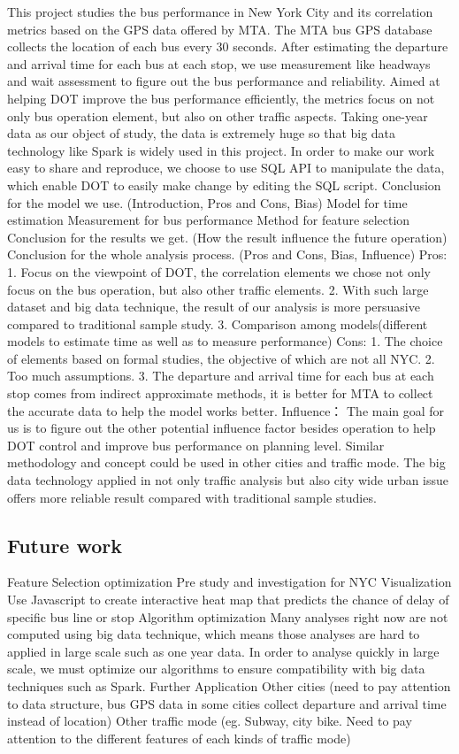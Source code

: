 \documentclass[12pt]{report}
\begin{document}
This project studies the bus performance in New York City and its correlation metrics based on the GPS data offered by MTA. The MTA bus GPS database collects the location of each bus every 30 seconds. After estimating the departure and arrival time for each bus at each stop, we use measurement like headways and wait assessment to figure out the bus performance and reliability. Aimed at helping DOT improve the bus performance efficiently, the metrics focus on not only bus operation element, but also on other traffic aspects. Taking one-year data as our object of study, the data is extremely huge so that big data technology like Spark is widely used in this project. In order to make our work easy to share and reproduce, we choose to use SQL API to manipulate the data, which enable DOT to easily make change by editing the SQL script. 
Conclusion for the model we use. (Introduction, Pros and Cons, Bias)
Model for time estimation
Measurement for bus performance
Method for feature selection
Conclusion for the results we get. (How the result influence the future operation)
Conclusion for the whole analysis process. (Pros and Cons, Bias, Influence)
Pros:
1. Focus on the viewpoint of DOT, the correlation elements we chose not only focus on the bus operation, but also other traffic elements.
2. With such large dataset and big data technique, the result of our analysis is more persuasive compared to traditional sample study.
3. Comparison among models(different models to estimate time as well as to measure performance)
Cons:
1. The choice of elements based on formal studies, the objective of which are not all NYC.
2. Too much assumptions.
3. The departure and arrival time for each bus at each stop comes from indirect approximate methods, it is better for MTA to collect the accurate data to help the model works better.
Influence：
The main goal for us is to figure out the other potential influence factor besides operation to help DOT control and improve bus performance on planning level. Similar methodology and concept could be used in other cities and traffic mode. The big data technology applied in not only traffic analysis but also city wide urban issue offers more reliable result compared with traditional sample studies. 


\subsection{Future work}

Feature Selection optimization
Pre study and investigation for NYC
Visualization
Use Javascript to create interactive heat map that predicts the chance of delay of specific bus line or stop
Algorithm optimization
Many analyses right now are not computed using big data technique, which means those analyses are hard to applied in large scale such as one year data. In order to analyse quickly in large scale, we must optimize our algorithms to ensure compatibility with big data techniques such as Spark.
Further Application
Other cities (need to pay attention to data structure, bus GPS data in some cities collect departure and arrival time instead of location)
Other traffic mode (eg. Subway, city bike. Need to pay attention to the different features of each kinds of traffic mode)
\end{document}
